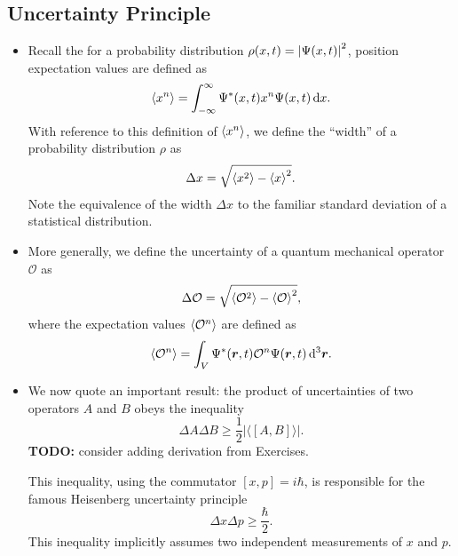 \documentclass[11pt, a4paper]{article}
\newcommand{\diff}{\mathop{}\!\mathrm{d}} %
\newcommand{\dr}{\diff^{3} \r}  %
\renewcommand{\vec}[1]{\bm{#1}}  %
\renewcommand{\r}{\vec{r}}  %
\renewcommand{\O}{\mathcal{O}}  %
\renewcommand{\P}{\Psi}  %
\newcommand{\evb}[1]{\big \langle {#1} \big \rangle}  %
\begin{document}
\subsection{Uncertainty Principle}
\begin{itemize}
	\item Recall the for a probability distribution $ \rho(x, t) = \abs{\P(x, t)}^{2} $, position expectation values are defined as
	\begin{equation*}
		\ev{x^{n}} = \int_{-\infty}^{\infty} \P^{*}(x, t) x^{n} \P(x, t) \diff x.
	\end{equation*}
	With reference to this definition of $ \ev{x^{n}} $, we define the ``width'' of a probability distribution $ \rho $ as
	\begin{equation*}
		\Delta x = \sqrt{\ev{x^{2}} - \ev{x}^{2}}.
	\end{equation*}
	Note the equivalence of the width $ \Delta x $ to the familiar standard deviation of a statistical distribution. 
	
	\item More generally, we define the uncertainty of a quantum mechanical operator $ \O $ as
	\begin{equation*}
		\Delta \O = \sqrt{\ev{\O^{2}} - \ev{\O}^{2}},
	\end{equation*}
	where the expectation values $ \ev{\O^{n}} $ are defined as
	\begin{equation*}
		\ev{\O^{n}} = \int_{V} \P^{*}(\r, t) \O^{n} \P(\r, t) \dr.
	\end{equation*}
	
	\item We now quote an important result: the product of uncertainties of two operators $ A $ and $ B $ obeys the inequality
	\begin{equation*}
		\Delta A \Delta B \geq \frac{1}{2} \big | \evb{[A, B]} \big |.
	\end{equation*} 
	\textbf{TODO:} consider adding derivation from Exercises.
	
	This inequality, using the commutator $ [x, p] = i \hbar $, is responsible for the famous Heisenberg uncertainty principle
	\begin{equation*}
		\Delta x \Delta p \geq \frac{\hbar}{2}.
	\end{equation*}
	This inequality implicitly assumes two independent measurements of $ x $ and $ p $.
	
\end{itemize}
\end{document}
